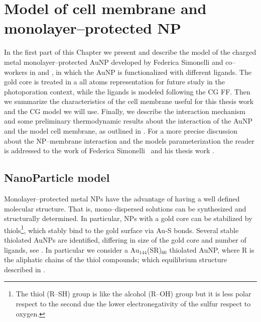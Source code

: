 \chapter{Model of cell membrane and monolayer--protected NP}
\label{chap:tre}
In the first part of this Chapter we present and describe the model of the charged metal monolayer--protected \ac{AuNP} developed by Federica Simonelli and co--workers in \cite{simonelliThesis} and \cite{ourPaper}, in which the \ac{AuNP} is functionalized with different ligands. The gold core is treated in a all atoms representation for future study in the photoporation context, while the ligands is modeled following the \martini \ac{CG} \ac{FF}. Then we summarize the characteristics of the cell membrane useful for this thesis work and the \martini \ac{CG} model we will use. Finally, we describe the interaction mechanism and some preliminary thermodynamic results about the interaction of the \ac{AuNP} and the model cell membrane, as outlined in \cite{ourPaper}. For a more precise discussion about the \ac{NP}--membrane interaction and the models parameterization the reader is addressed to the work of Federica Simonelli \etal\, \cite{ourPaper} and his thesis work \cite{simonelliThesis}.

\section{NanoParticle model}
Monolayer--protected metal \acp{NP} have the advantage of having a well defined molecular structure. That is, mono--dispersed solutions can be synthesized and structurally determined. In particular, \acp{NP} with a gold core can be stabilized by thiols\footnote{The thiol (R--SH) group is like the alcohol (R--OH) group but it is less polar respect to the second due the lower electronegativity of the sulfur respect to oxygen.}, which stably bind to the gold surface via Au-S bonds. 
Several stable thiolated \acp{AuNP} are identified, differing in size of the gold core and number of ligands, see \cite{corePassivated}. In particular we consider a {Au$_{144}$(SR)$_{60}$} thiolated \ac{AuNP}, where R is the aliphatic chains of the thiol compounds; which equilibrium structure described in \cite{clusterEquilibrium}. 


